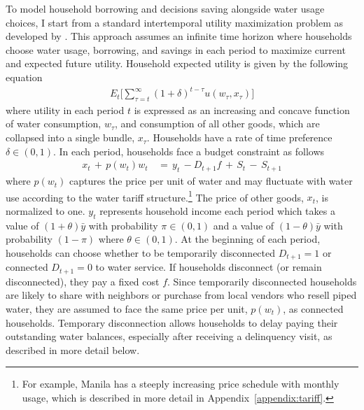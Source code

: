 \documentclass[12pt]{article}
\begin{document}
To model household borrowing and decisions saving alongside water usage choices, I start from a standard intertemporal utility maximization problem as developed by \cite{deaton1991saving}.  This approach assumes an infinite time horizon where households choose water usage, borrowing, and savings in each period to maximize current and expected future utility.  Household expected utility is given by the following equation
\begin{align}\label{eq:u}
E_t \Big[ \sum_{\tau = t}^{\infty} (1+\delta)^{t-\tau} u(w_{\tau},x_{\tau})   \Big]
\end{align}
where utility in each period $t$ is expressed as an increasing and concave function of water consumption, $w_{\tau}$, and consumption of all other goods, which are collapsed into a single bundle, $x_{\tau}$.  Households have a rate of time preference $\delta \in (0,1)$.  In each period, households face a budget constraint as follows
\begin{align}\label{eq:bc}
x_t \, + \, p(w_t) w_t \, &= \, y_t \, - D_{t+1} f  \, + \, S_t \, - \, S_{t+1}
\end{align}
where $p(w_t)$ captures the price per unit of water and may fluctuate with water use according to the water tariff structure.\footnote{For example, Manila has a steeply increasing price schedule with monthly usage, which is described in more detail in Appendix~\ref{appendix:tariff}.}  The price of other goods, $x_t$, is normalized to one.  $y_t$ represents household income each period which takes a value of $(1+\theta)\bar{y}$ with probability $\pi \in (0,1)$ and a value of $(1-\theta)\bar{y}$ with probability $(1-\pi)$ where $\theta  \in (0,1)$.  At the beginning of each period, households can choose whether to be temporarily disconnected $D_{t+1}=1$ or connected $D_{t+1}=0$ to water service.  If households disconnect (or remain disconnected), they pay a fixed cost $f$.  Since temporarily disconnected households are likely to share with neighbors or purchase from local vendors who resell piped water, they are assumed to face the same price per unit, $p(w_t)$, as connected households.  Temporary disconnection allows households to delay paying their outstanding water balances, especially after receiving a delinquency visit, as described in more detail below.  
\end{document}

